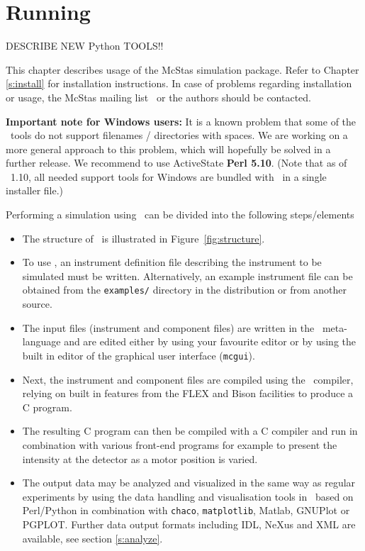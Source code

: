
\chapter{Running \MCS}
\label{c:running}

DESCRIBE NEW Python TOOLS!!

This chapter describes usage of the McStas simulation package. Refer
to Chapter \ref{s:install} for installation instructions. In case of
problems regarding installation or usage, the McStas mailing
list~\cite{mcstas_webpage} or the authors should be contacted.

{\bf Important note for Windows users:} It is a known problem that some of
the \MCS\ tools do not support filenames / directories with spaces.
We are working on a more general approach to this problem, which will
hopefully be solved in a further release. We recommend to use
ActiveState {\bf Perl 5.10}. (Note that as of \MCS\ 1.10, all needed
support tools for Windows are bundled with \MCS\ in a single installer file.)

Performing a simulation using \MCS\ can be divided into the following
steps/elements
\begin{itemize}
\item{The structure of \MCS\ is illustrated in
    Figure~\ref{fig:structure}.}
\item{To use \MCS, an instrument
definition file describing the instrument to be simulated must be
written. Alternatively, an example instrument file can be obtained
from the \verb+examples/+ directory in the distribution or from
another source.}
\item{The input files (instrument and component files) are written in the \MCS\
meta-language and are edited either by using your favourite editor
or by using the built in editor of the graphical user interface
(\texttt{mcgui}).}
\item{Next, the instrument and component files are compiled using the \MCS\
compiler, relying on built in features from the FLEX and Bison facilities to produce a C program.}
\item{The resulting C program can then be
compiled with a C compiler and run in combination with various
front-end programs for example to present the intensity at the
detector as a motor position is varied.}
\item{The output data may be analyzed and visualized in the same way as regular
    experiments by using the data handling and visualisation tools in \MCS\
    based on Perl/Python in combination with \verb+chaco+, \verb+matplotlib+,
    Matlab, GNUPlot or PGPLOT. Further data output formats including IDL, NeXus
    and XML are available, see section \ref{s:analyze}.\index{Tools}}
\end{itemize}

